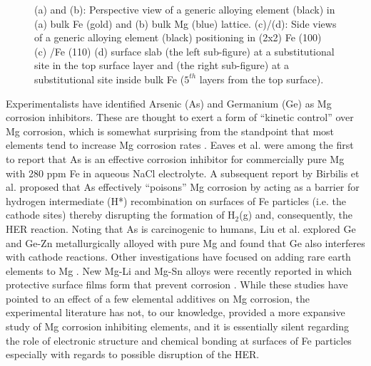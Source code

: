 \begin{figure}[!ht]
\caption[Perspective and side views of a generic alloying element in the simulation]{(a) and (b): Perspective view of a generic alloying element (black) in (a) bulk Fe (gold) and (b) bulk Mg (blue) lattice. (c)/(d): Side views of a generic alloying element (black) positioning in (2x2) Fe (100) (c) /Fe (110) (d) surface slab (the left sub-figure) at a substitutional site in the top surface layer and (the right sub-figure) at a substitutional site inside bulk Fe ($5^{th}$ layers from the top surface).}
  \label{Chap:Mg_H:fig2}
\end{figure}
\endgroup


Experimentalists have identified Arsenic (As) and Germanium (Ge) as Mg corrosion inhibitors. These are thought to exert a form of “kinetic control” over Mg corrosion, which is somewhat surprising from the standpoint that most elements tend to increase Mg corrosion rates \cite{liu2016controlling}. Eaves et al. \cite{eaves2012inhibition} were among the first to report that As is an effective corrosion inhibitor for commercially pure Mg with 280 ppm Fe in aqueous NaCl electrolyte. A subsequent report by Birbilis et al. \cite{birbilis2014evidence} proposed that As effectively ``poisons'' Mg corrosion by acting as a barrier for hydrogen intermediate (H*) recombination on surfaces of Fe particles (i.e. the cathode sites) thereby disrupting the formation of $\text{H}_2$(g) and, consequently, the \ac{HER} reaction. Noting that As is carcinogenic to humans, Liu et al. \cite{liu2016controlling,liu2018simultaneously} explored Ge and Ge-Zn metallurgically alloyed with pure Mg and found that Ge also interferes with cathode reactions. Other investigations have focused on adding rare earth elements to Mg \cite{birbilis2009corrosion,liu2009effect,shi2013corrosion}. New Mg-Li and Mg-Sn alloys were recently reported in which protective surface films form that prevent corrosion \cite{xu2015high,cain2019corrosion}. While these studies have pointed to an effect of a few elemental additives on Mg corrosion, the experimental literature has not, to our knowledge, provided a more expansive study of Mg corrosion inhibiting elements, and it is essentially silent regarding the role of electronic structure and chemical bonding at surfaces of Fe particles especially with regards to possible disruption of the \ac{HER}.



